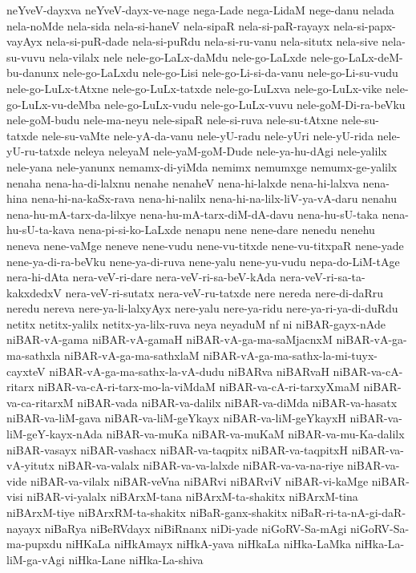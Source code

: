 {neYveV-dayxva
neYveV-dayx-ve-nage
nega-Lade
nega-LidaM
nege-danu
nelada
nela-noMde
nela-sida
nela-si-haneV
nela-sipaR
nela-si-paR-rayayx
nela-si-papx-vayAyx
nela-si-puR-dade
nela-si-puRdu
nela-si-ru-vanu
nela-situtx
nela-sive
nela-su-vuvu
nela-vilalx
nele
nele-go-LaLx-daMdu
nele-go-LaLxde
nele-go-LaLx-deM-bu-danunx
nele-go-LaLxdu
nele-go-Lisi
nele-go-Li-si-da-vanu
nele-go-Li-su-vudu
nele-go-LuLx-tAtxne
nele-go-LuLx-tatxde
nele-go-LuLxva
nele-go-LuLx-vike
nele-go-LuLx-vu-deMba
nele-go-LuLx-vudu
nele-go-LuLx-vuvu
nele-goM-Di-ra-beVku
nele-goM-budu
nele-ma-neyu
nele-sipaR
nele-si-ruva
nele-su-tAtxne
nele-su-tatxde
nele-su-vaMte
nele-yA-da-vanu
nele-yU-radu
nele-yUri
nele-yU-rida
nele-yU-ru-tatxde
neleya
neleyaM
nele-yaM-goM-Dude
nele-ya-hu-dAgi
nele-yalilx
nele-yana
nele-yanunx
nemamx-di-yiMda
nemimx
nemumxge
nemumx-ge-yalilx
nenaha
nena-ha-di-lalxnu
nenahe
nenaheV
nena-hi-lalxde
nena-hi-lalxva
nena-hina
nena-hi-na-kaSx-rava
nena-hi-nalilx
nena-hi-na-lilx-liV-ya-vA-daru
nenahu
nena-hu-mA-tarx-da-lilxye
nena-hu-mA-tarx-diM-dA-davu
nena-hu-sU-taka
nena-hu-sU-ta-kava
nena-pi-si-ko-LaLxde
nenapu
nene
nene-dare
nenedu
nenehu
neneva
nene-vaMge
neneve
nene-vudu
nene-vu-titxde
nene-vu-titxpaR
nene-yade
nene-ya-di-ra-beVku
nene-ya-di-ruva
nene-yalu
nene-yu-vudu
nepa-do-LiM-tAge
nera-hi-dAta
nera-veV-ri-dare
nera-veV-ri-sa-beV-kAda
nera-veV-ri-sa-ta-kakxdedxV
nera-veV-ri-sutatx
nera-veV-ru-tatxde
nere
nereda
nere-di-daRru
neredu
nereva
nere-ya-li-lalxyAyx
nere-yalu
nere-ya-ridu
nere-ya-ri-ya-di-duRdu
netitx
netitx-yalilx
netitx-ya-lilx-ruva
neya
neyaduM
nf
ni
niBAR-gayx-nAde
niBAR-vA-gama
niBAR-vA-gamaH
niBAR-vA-ga-ma-saMjacnxM
niBAR-vA-ga-ma-sathxla
niBAR-vA-ga-ma-sathxlaM
niBAR-vA-ga-ma-sathx-la-mi-tuyx-cayxteV
niBAR-vA-ga-ma-sathx-la-vA-dudu
niBARva
niBARvaH
niBAR-va-cA-ritarx
niBAR-va-cA-ri-tarx-mo-la-viMdaM
niBAR-va-cA-ri-tarxyXmaM
niBAR-va-ca-ritarxM
niBAR-vada
niBAR-va-dalilx
niBAR-va-diMda
niBAR-va-hasatx
niBAR-va-liM-gava
niBAR-va-liM-geYkayx
niBAR-va-liM-geYkayxH
niBAR-va-liM-geY-kayx-nAda
niBAR-va-muKa
niBAR-va-muKaM
niBAR-va-mu-Ka-dalilx
niBAR-vasayx
niBAR-vashacx
niBAR-va-taqpitx
niBAR-va-taqpitxH
niBAR-va-vA-yitutx
niBAR-va-valalx
niBAR-va-va-lalxde
niBAR-va-va-na-riye
niBAR-va-vide
niBAR-va-vilalx
niBAR-veVna
niBARvi
niBARviV
niBAR-vi-kaMge
niBAR-visi
niBAR-vi-yalalx
niBArxM-tana
niBArxM-ta-shakitx
niBArxM-tina
niBArxM-tiye
niBArxRM-ta-shakitx
niBaR-ganx-shakitx
niBaR-ri-ta-nA-gi-daR-nayayx
niBaRya
niBeRVdayx
niBiRnanx
niDi-yade
niGoRV-Sa-mAgi
niGoRV-Sa-ma-pupxdu
niHKaLa
niHkAmayx
niHkA-yava
niHkaLa
niHka-LaMka
niHka-La-liM-ga-vAgi
niHka-Lane
niHka-La-shiva
}
